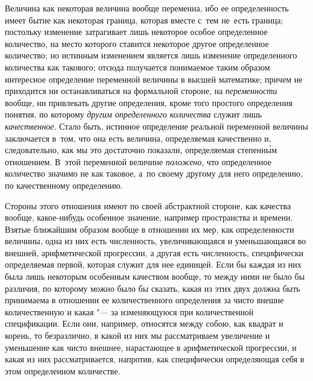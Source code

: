 Величина как некоторая величина вообще переменна, ибо ее определенность имеет
бытие как некоторая граница, которая вместе с~тем не~есть граница; постольку
изменение затрагивает лишь некоторое особое определенное количество, на место
которого ставится некоторое другое определенное количество; но истинным
изменением является лишь изменение определенного количества как такового;
отсюда получается понимаемое таким образом интересное определение переменной
величины в высшей математике; причем не приходится ни останавливаться на
формальной стороне, на {\em переменности} вообще, ни привлекать другие
определения, кроме того простого определения понятия, по которому
{\em другим определенного количества} служит лишь {\em качественное}. Стало
быть, истинное определение реальной переменной величины заключается в~том, что
она есть величина, определяемая качественно и, следовательно, как мы это
достаточно показали, определяемая степенн\'{ы}м отношением. В~этой переменной
величине {\em положено}, что определенное количество значимо не как таковое,
а~по своему другому для него определению, по качественному определению.

Стороны этого отношения имеют по своей абстрактной стороне, как качества
вообще, какое-нибудь особенное значение, например пространства и времени.
Взятые ближайшим образом вообще в отношении их мер, как определенности
величины, одна из них есть численность, увеличивающаяся и уменьшающаяся во
внешней, арифметической прогрессии, а другая есть численность, специфически
определяемая первой, которая служит для нее единицей. Если бы каждая из них
была лишь некоторым особенным качеством вообще, то между ними не было бы
различия, по которому можно было бы сказать, какая из этих двух должна быть
принимаема в отношении ее количественного определения за чисто внешне
количественную и какая "--- за изменяющуюся при количественной спецификации.
Если они, например, относятся между собою, как квадрат и корень, то
безразлично, в какой из них мы рассматриваем увеличение и уменьшение как чисто
внешнее, нарастающее в арифметической прогрессии, и какая из них
рассматривается, напротив, как специфически определяющая себя в этом
определенном количестве.

